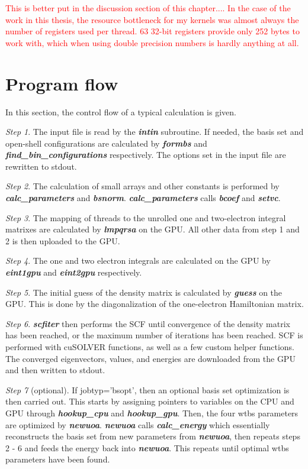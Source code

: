 \documentclass[12pt]{book}
\newcommand{\notetodylan}[1]{\textcolor{red}{#1}} %
\begin{document}
\notetodylan{This is better put in the discussion section of this chapter.... In the case of the work in this thesis, the resource bottleneck for my kernels was almost always the number of registers used per thread. 63 32-bit registers provide only 252 bytes to work with, which when using double precision numbers is hardly anything at all.}

\section{Program flow}
In this section, the control flow of a typical calculation is given.

\textit{Step 1}. The input file is read by the \textit{\textbf{intin}} subroutine. If needed, the basis set and open-shell configurations are calculated by \textit{\textbf{formbs}} and \textit{\textbf{find\_bin\_configurations}} respectively. The options set in the input file are rewritten to stdout.

\textit{Step 2}. The calculation of small arrays and other constants is performed by \textit{\textbf{calc\_parameters}} and \textit{\textbf{bsnorm}}. \textit{\textbf{calc\_parameters}} calls \textit{\textbf{bcoef}} and \textit{\textbf{setvc}}.

\textit{Step 3}. The mapping of threads to the unrolled one and two-electron integral matrixes are calculated by \textit{\textbf{lmpqrsa}} on the GPU. All other data from step 1 and 2 is then uploaded to the GPU.

\textit{Step 4}. The one and two electron integrals are calculated on the GPU by \textit{\textbf{eint1gpu}} and \textit{\textbf{eint2gpu}} respectively.

\textit{Step 5}. The initial guess of the density matrix is calculated by \textit{\textbf{guess}} on the GPU. This is done by the diagonalization of the one-electron Hamiltonian matrix.

\textit{Step 6}. \textit{\textbf{scfiter}} then performs the SCF until convergence of the density matrix has been reached, or the maximum number of iterations has been reached. SCF is performed with cuSOLVER functions, as well as a few custom helper functions. The converged eigenvectors, values, and energies are downloaded from the GPU and then written to stdout.

\textit{Step 7} (optional). If jobtyp='bsopt', then an optional basis set optimization is then carried out. This starts by assigning pointers to variables on the CPU and GPU through \textit{\textbf{hookup\_cpu}} and \textit{\textbf{hookup\_gpu}}. Then, the four wtbs parameters are optimized by \textit{\textbf{newuoa}}. \textit{\textbf{newuoa}} calls \textit{\textbf{calc\_energy}} which essentially reconstructs the basis set from new parameters from \textit{\textbf{newuoa}}, then repeats steps 2 - 6 and feeds the energy back into \textit{\textbf{newuoa}}. This repeats until optimal wtbs parameters have been found.
\end{document}
